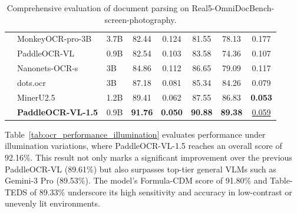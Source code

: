 \documentclass[11pt, a4paper,logo,  copyright, nonumbering]{paddleocr}
\begin{document}
\begin{table}[H]
{\begin{tabular}{l|ll|c|c c c c}
         & MonkeyOCR-pro-3B ~\cite{li2025monkeyocr}& 3.7B & 82.44 & 0.124 & 81.55 & 78.13 & 0.177 \\
         & PaddleOCR-VL ~\cite{cui2025paddleocrvl}& 0.9B & 82.54 & 0.103 & 83.58 & 74.36 & 0.107 \\
         & Nanonets-OCR-s~\cite{Nanonets-OCR-S} & 3B & 84.86 & 0.112 & 86.65 & 79.09 & 0.117 \\
         & dots.ocr~\cite{dotsocr} & 3B & 87.18 & 0.081 & 85.34 & 84.26 & 0.079 \\
         & MinerU2.5~\cite{niu2025mineru2} & 1.2B & 89.41 & 0.062 & 87.55 & 86.83 & \cellcolor{red!15}\textbf{0.053} \\ 
         & \textbf{PaddleOCR-VL-1.5} & 0.9B & \cellcolor{red!15}\textbf{91.76} & \cellcolor{red!15}\textbf{0.050} & \cellcolor{red!15}\textbf{90.88} & \cellcolor{red!15}\textbf{89.38} & \cellcolor{cyan!15}\underline{0.059} \\
        \bottomrule
    \end{tabular}%
    }
    \caption{Comprehensive evaluation of document parsing on Real5-OmniDocBench-screen-photography.}
    \label{tab:ocr_performance_screen_photography}
\end{table}


Table~\ref{tab:ocr_performance_illumination} evaluates performance under illumination variations, where PaddleOCR-VL-1.5 reaches an overall score of 92.16\%. This result not only marks a significant improvement over the previous PaddleOCR-VL (89.61\%) but also surpasses top-tier general VLMs such as Gemini-3 Pro (89.53\%). The model’s Formula-CDM score of 91.80\% and Table-TEDS of 89.33\% underscore its high sensitivity and accuracy in low-contrast or unevenly lit environments.
\end{document}
